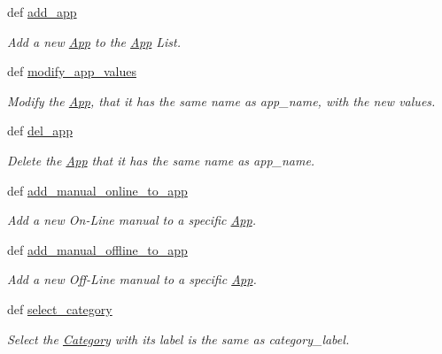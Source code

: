 \begin{CompactItemize}
def \hyperlink{classwinsollib_1_1Image_570270bfa2b73c87be771ea5125dad70}{add\_\-app}
\begin{CompactList}\small\item\em Add a new \hyperlink{classwinsollib_1_1App}{App} to the \hyperlink{classwinsollib_1_1App}{App} List. \item\end{CompactList}\item 
def \hyperlink{classwinsollib_1_1Image_8f33bdfd475227d8d5e58738e2fe28c6}{modify\_\-app\_\-values}
\begin{CompactList}\small\item\em Modify the \hyperlink{classwinsollib_1_1App}{App}, that it has the same name as {\em app\_\-name\/}, with the new values. \item\end{CompactList}\item 
def \hyperlink{classwinsollib_1_1Image_c4f162dc12906d2b7bd3d7966bc894dd}{del\_\-app}
\begin{CompactList}\small\item\em Delete the \hyperlink{classwinsollib_1_1App}{App} that it has the same name as {\em app\_\-name\/}. \item\end{CompactList}\item 
def \hyperlink{classwinsollib_1_1Image_d0ca5577484af8a757812ac1f3087d79}{add\_\-manual\_\-online\_\-to\_\-app}
\begin{CompactList}\small\item\em Add a new On-Line manual to a specific \hyperlink{classwinsollib_1_1App}{App}. \item\end{CompactList}\item 
def \hyperlink{classwinsollib_1_1Image_87440976a593d93094c5ab228079b50d}{add\_\-manual\_\-offline\_\-to\_\-app}
\begin{CompactList}\small\item\em Add a new Off-Line manual to a specific \hyperlink{classwinsollib_1_1App}{App}. \item\end{CompactList}\item 
def \hyperlink{classwinsollib_1_1Image_72257b871ac2df33ebf57cc2ccdc104e}{select\_\-category}
\begin{CompactList}\small\item\em Select the \hyperlink{classwinsollib_1_1Category}{Category} with its label is the same as {\em category\_\-label\/}. \item\end{CompactList}\item 

\end{CompactItemize}
